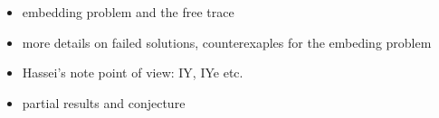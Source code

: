 \begin{itemize}
	\item embedding problem and the free trace
	\item more details on failed solutions, counterexaples for the embeding problem
	\item Hassei's note point of view: IY, IYe etc.
	\item partial results and conjecture
\end{itemize}








